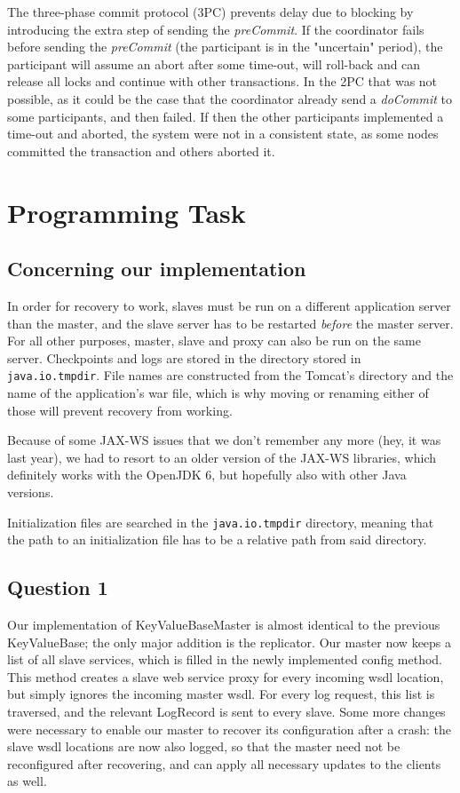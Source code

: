\documentclass[12pt,a4paper,fleqn]{article}
\begin{document}
The three-phase commit protocol (3PC) prevents delay due to blocking by introducing the extra step of sending the \emph{preCommit}. If the coordinator fails before sending the \emph{preCommit} (the participant is in the "uncertain" period), the participant will assume an abort after some time-out, will roll-back and can release all locks and continue with other transactions. In the 2PC that was not possible, as it could be the case that the coordinator already send a \emph{doCommit} to some participants, and then failed. If then the other participants implemented a time-out and aborted, the system were not in a consistent state, as some nodes committed the transaction and others aborted it.

\section*{Programming Task} 
\label{sec:programming}

\subsection*{Concerning our implementation}
In order for recovery to work, slaves must be run on a different application server than the master, and the slave server has to be restarted \emph{before} the master server. For all other purposes, master, slave and proxy can also be run on the same server. Checkpoints and logs are stored in the directory stored in \texttt{java.io.tmpdir}. File names are constructed from the Tomcat's directory and the name of the application's war file, which is why moving or renaming either of those will prevent recovery from working.

Because of some JAX-WS issues that we don't remember any more (hey, it was last year), we had to resort to an older version of the JAX-WS libraries, which definitely works with the OpenJDK 6, but hopefully also with other Java versions. 

Initialization files are searched in the \texttt{java.io.tmpdir} directory, meaning that the path to an initialization file has to be a relative path from said directory.

\subsection*{Question 1}
\label{sec:pq1}

Our implementation of KeyValueBaseMaster is almost identical to the previous KeyValueBase; the only major addition is the replicator. Our master now keeps a list of all slave services, which is filled in the newly implemented config method. This method creates a slave web service proxy for every incoming wsdl location, but simply ignores the incoming master wsdl. For every log request, this list is traversed, and the relevant LogRecord is sent to every slave. Some more changes were necessary to enable our master to recover its configuration after a crash: the slave wsdl locations are now also logged, so that the master need not be reconfigured after recovering, and can apply all necessary updates to the clients as well. 
\end{document}
